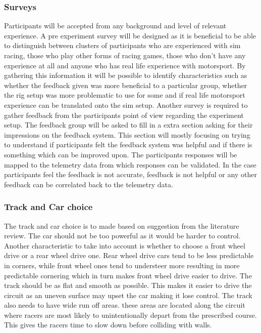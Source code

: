 \subsubsection{Surveys}
	Participants will be accepted from any background and level of relevant experience. A pre experiment survey will be designed as it is beneficial to be able to distinguish between clusters of participants who are experienced with sim racing, those who play other forms of racing games, those who don't have any experience at all and anyone who has real life experience with motorsport. By gathering this information it will be possible to identify characteristics such as whether the feedback given was more beneficial to a particular group, whether the rig setup was more problematic to use for some and if real life motorsport experience can be translated onto the sim setup. Another survey is required to gather feedback from the participants point of view regarding the experiment setup. The feedback group will be asked to fill in a extra section asking for their impressions on the feedback system. This section will mostly focusing on trying to understand if participants felt the feedback system was helpful and if there is something which can be improved upon. The participants responses will be mapped to the telemetry data from which responses can be validated. In the case participants feel the feedback is not accurate, feedback is not helpful or any other feedback can be correlated back to the telemetry data.
	
\subsubsection{Track and Car choice}
	The track and car choice is to made based on suggestion from the literature review. The car should not be too powerful as it would be harder to control. Another characteristic to take into account is whether to choose a front wheel drive or a rear wheel drive one. Rear wheel drive cars tend to be less predictable in corners, while front wheel ones tend to understeer more resulting in more predictable cornering which in turn makes front wheel drive easier to drive. The track should be as flat and smooth as possible. This makes it easier to drive the circuit as an uneven surface may upset the car making it lose control. The track also needs to have wide run off areas. these areas are located along the circuit where racers are most likely to unintentionally depart from the prescribed course. This gives the racers time to slow down before colliding with walls.
	
